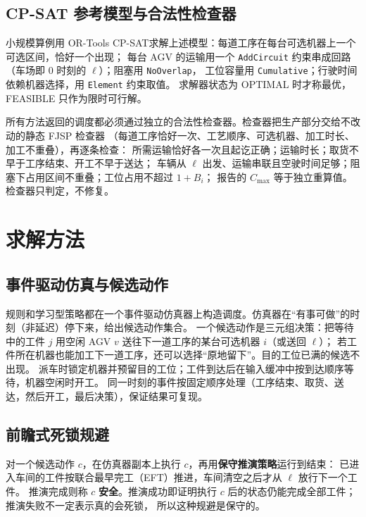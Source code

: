\documentclass[11pt,a4paper]{ctexart}
\theoremstyle{definition}
\theoremstyle{remark}
\newcommand{\LU}{\ell}
\begin{document}
\subsection{CP-SAT 参考模型与合法性检查器}

小规模算例用 OR-Tools CP-SAT\cite{ortools}求解上述模型：每道工序在每台可选机器上一个可选区间，恰好一个出现；
每台 AGV 的运输用一个 \texttt{AddCircuit} 约束串成回路（车场即 0 时刻的 $\LU$）；阻塞用 \texttt{NoOverlap}，
工位容量用 \texttt{Cumulative}；行驶时间依赖机器选择，用 \texttt{Element} 约束取值。
求解器状态为 OPTIMAL 时才称最优，FEASIBLE 只作为限时可行解。

所有方法返回的调度都必须通过独立的合法性检查器。检查器把生产部分交给不改动的静态 FJSP 检查器
（每道工序恰好一次、工艺顺序、可选机器、加工时长、加工不重叠），再逐条检查：
所需运输恰好各一次且起讫正确；运输时长；取货不早于工序结束、开工不早于送达；
车辆从 $\LU$ 出发、运输串联且空驶时间足够；阻塞下占用区间不重叠；工位占用不超过 $1+B_i$；
报告的 $C_{\max}$ 等于独立重算值。检查器只判定，不修复。

\section{求解方法}

\subsection{事件驱动仿真与候选动作}

规则和学习型策略都在一个事件驱动仿真器上构造调度。仿真器在“有事可做”的时刻（非延迟）停下来，给出候选动作集合。
一个候选动作是三元组决策：把等待中的工件 $j$ 用空闲 AGV $v$ 送往下一道工序的某台可选机器 $i$（或送回 $\LU$）；
若工件所在机器也能加工下一道工序，还可以选择“原地留下”。目的工位已满的候选不出现。
派车时锁定机器并预留目的工位；工件到达后在输入缓冲中按到达顺序等待，机器空闲时开工。
同一时刻的事件按固定顺序处理（工序结束、取货、送达，然后开工，最后决策），保证结果可复现。

\subsection{前瞻式死锁规避}

对一个候选动作 $c$，在仿真器副本上执行 $c$，再用\textbf{保守推演策略}运行到结束：
已进入车间的工件按联合最早完工（EFT）推进，车间清空之后才从 $\LU$ 放行下一个工件。
推演完成则称 $c$ \textbf{安全}。推演成功即证明执行 $c$ 后的状态仍能完成全部工件；推演失败不一定表示真的会死锁，
所以这种规避是保守的。
\end{document}
